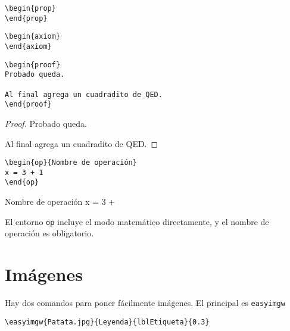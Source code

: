 \documentclass{apuntes}
\begin{document}
\begin{corol}
\end{corol}

\begin{verbatim}
\begin{prop}
\end{prop}
\end{verbatim}

\begin{prop}
\end{prop}

\begin{verbatim}
\begin{axiom}
\end{axiom}
\end{verbatim}

\begin{axiom}
\end{axiom}

\begin{verbatim}
\begin{proof}
Probado queda.

Al final agrega un cuadradito de QED.
\end{proof}
\end{verbatim}

\begin{proof}
Probado queda. 

Al final agrega un cuadradito de QED.
\end{proof}

\begin{verbatim}
\begin{op}{Nombre de operación}
x = 3 + 1
\end{op}
\end{verbatim}

\begin{op}{Nombre de operación}
x = 3 +  
\end{op}

El entorno \texttt{op} incluye el modo matemático directamente, y el nombre de operación es obligatorio.
 
\section{Imágenes}

Hay dos comandos para poner fácilmente imágenes. El principal es \texttt{easyimgw}

\begin{verbatim}
\easyimgw{Patata.jpg}{Leyenda}{lblEtiqueta}{0.3}
\end{verbatim}
\end{document}

